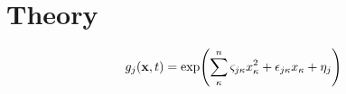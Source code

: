 \section{Theory}

\begin{eqnarray}
g_j({\bf x},t)=\exp(\sum_\kappa^n\varsigma_{j\kappa}x^2_\kappa+\epsilon_{j\kappa}x_\kappa+\eta_j)
\end{eqnarray}

